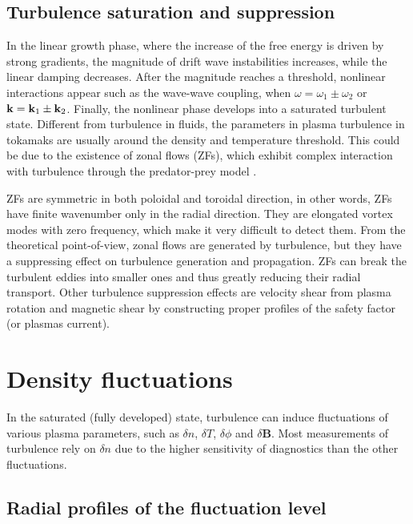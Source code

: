 \subsection{Turbulence saturation and suppression}

In the linear growth phase, where the increase of the free energy is driven by strong gradients, the magnitude of drift wave instabilities increases, while the linear damping decreases. After the magnitude reaches a threshold, nonlinear interactions appear such as the wave-wave coupling, when $\omega = \omega_1 \pm \omega_2$ or $\boldsymbol{\mathrm{k}} = \boldsymbol{\mathrm{k}}_1 \pm \boldsymbol{\mathrm{k}}_2$. Finally, the nonlinear phase develops into a saturated turbulent state. Different from turbulence in fluids, the parameters in plasma turbulence in tokamaks are usually around the density and temperature threshold. This could be due to the existence of zonal flows (ZFs), which exhibit complex interaction with turbulence through the predator-prey model \cite{Diamond_ZF_2005_PPCF}.

ZFs are symmetric in both poloidal and toroidal direction, in other words, ZFs have finite wavenumber only in the radial direction. They are elongated vortex modes with zero frequency, which make it very difficult to detect them. From the theoretical point-of-view, zonal flows are generated by turbulence, but they have a suppressing effect on turbulence generation and propagation. ZFs can break the turbulent eddies into smaller ones and thus greatly reducing their radial transport. Other turbulence suppression effects are velocity shear from plasma rotation and magnetic shear by constructing proper profiles of the safety factor (or plasmas current).


\section{Density fluctuations} \label{sec:properties_of_density_fluctuations}

In the saturated (fully developed) state, turbulence can induce fluctuations of various plasma parameters, such as $\delta n$, $\delta T$, $\delta\phi$ and $\delta$\textbf{B}. Most measurements of turbulence rely on $\delta n$ due to the higher sensitivity of diagnostics than the other fluctuations.


\subsection{Radial profiles of the fluctuation level}

